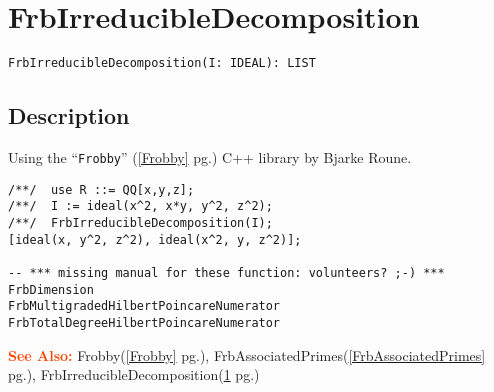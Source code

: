 \documentclass[a4paper]{mybook}
\newenvironment{command}{}{} %
\newcommand\SeeAlso{\par\textcolor{OrangeRed}{\textbf{\large See Also: }}}
\begin{document}
\section{FrbIrreducibleDecomposition}
\label{FrbIrreducibleDecomposition}
\begin{command} %


\begin{Verbatim}[label=syntax, rulecolor=\color{MidnightBlue},
frame=single]
FrbIrreducibleDecomposition(I: IDEAL): LIST
\end{Verbatim}


\subsection*{Description}

Using the ``\verb&Frobby&'' (\ref{Frobby} pg.\pageref{Frobby}) C++ library by Bjarke Roune.
\begin{Verbatim}[label=example, rulecolor=\color{PineGreen}, frame=single]
/**/  use R ::= QQ[x,y,z];
/**/  I := ideal(x^2, x*y, y^2, z^2);
/**/  FrbIrreducibleDecomposition(I);
[ideal(x, y^2, z^2), ideal(x^2, y, z^2)];

-- *** missing manual for these function: volunteers? ;-) ***
FrbDimension
FrbMultigradedHilbertPoincareNumerator
FrbTotalDegreeHilbertPoincareNumerator
\end{Verbatim}


\SeeAlso %
  Frobby(\ref{Frobby} pg.\pageref{Frobby}), 
    FrbAssociatedPrimes(\ref{FrbAssociatedPrimes} pg.\pageref{FrbAssociatedPrimes}), 
    FrbIrreducibleDecomposition(\ref{FrbIrreducibleDecomposition} pg.\pageref{FrbIrreducibleDecomposition})
\end{command} %
\end{document}
